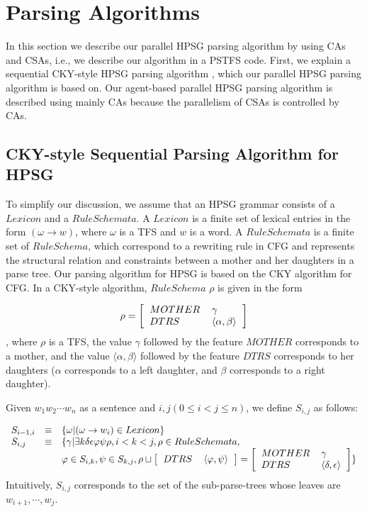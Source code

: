 \section{Parsing Algorithms}
  In this section we describe our parallel HPSG parsing algorithm by
using CAs and CSAs, i.e., we describe our algorithm in a PSTFS code.
First, we explain a sequential CKY-style HPSG parsing algorithm
\cite{Haas87}, which our parallel HPSG parsing algorithm is based on.
Our agent-based parallel HPSG parsing algorithm is described using
mainly CAs because the parallelism of CSAs is controlled by CAs.

\subsection{CKY-style Sequential Parsing Algorithm for HPSG}
  To simplify our discussion, we assume that an HPSG grammar consists
of a $Lexicon$ and a $RuleSchemata$.  A $Lexicon$ is a finite set of
lexical entries in the form $(\omega \rightarrow w)$, where $\omega$
is a TFS and $w$ is a word.  A $RuleSchemata$ is a finite set of
$RuleSchema$, which correspond to a rewriting rule in CFG and
represents the structural relation and constraints between a mother and
her daughters in a parse tree.  Our parsing algorithm for HPSG is based on
the CKY algorithm for CFG. In a CKY-style algorithm, $RuleSchema$
$\rho$ is given in the form

\[
\rho = 
\left[	\begin{tabular}{ll}
	$MOTHER$		& $\gamma$\\
	$DTRS$		& $\langle \alpha, \beta \rangle$\\
	\end{tabular}
\right]
\]
, where $\rho$ is a TFS, the value $\gamma$ followed by the feature
$MOTHER$ corresponds to a mother, and the value $\langle \alpha, \beta
\rangle$ followed by the feature $DTRS$ corresponds to her daughters
($\alpha$ corresponds to a left daughter, and $\beta$ corresponds to a
right daughter).

  Given $w_1 w_2 \cdots w_n$ as a sentence and $i,j (0 \leq i < j \leq n)$,
we define $S_{i,j}$ as follows:

\[
\begin{array}{lll}
S_{i-1,i} & \equiv & \{\omega|(\omega \rightarrow w_i) \in Lexicon\}\\
S_{i,j} & \equiv & \{\gamma|\exists k\delta \epsilon \varphi \psi \rho, i < k < j, \rho \in RuleSchemata,\\
	&	& \varphi \in S_{i,k}, \psi \in S_{k,j}, \rho
\sqcup
\left[	\begin{tabular}{ll}
	$DTRS$ & $\langle \varphi, \psi \rangle$\\
	\end{tabular} \right]
=
\left[	\begin{tabular}{ll}
	$MOTHER$ & $\gamma$\\
	$DTRS$ & $\langle \delta, \epsilon \rangle$\\
	\end{tabular}
\right]\}\\
\end{array}
\]
Intuitively, $S_{i,j}$ corresponds to the set of the sub-parse-trees whose leaves
are $w_{i+1},\cdots,w_j$.

